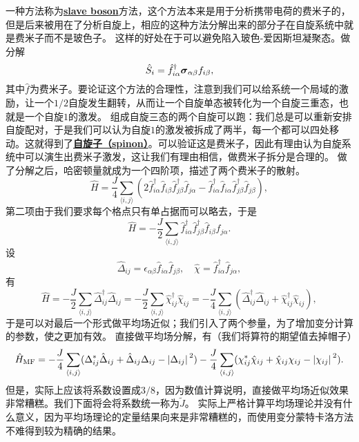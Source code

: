 \documentclass[hyperref, UTF8, a4paper]{ctexart}
\newcommand*{\pair}[1]{\langle #1 \rangle}
\newcommand*{\concept}[1]{\underline{\textbf{#1}}}
\begin{document}
一种方法称为\concept{slave boson}方法，这个方法本来是用于分析携带电荷的费米子的，但是后来被用在了分析自旋上，相应的这种方法分解出来的部分子在自旋系统中就是费米子而不是玻色子。
这样的好处在于可以避免陷入玻色-爱因斯坦凝聚态。做分解
\begin{equation}
    \hat{S}_i = \hat{f}_{i \alpha}^\dagger \vb*{\sigma}_{\alpha \beta} f_{i \beta},
\end{equation}
其中$\hat{f}$为费米子。要论证这个方法的合理性，注意到我们可以给系统一个局域的激励，让一个$1/2$自旋发生翻转，从而让一个自旋单态被转化为一个自旋三重态，也就是一个自旋$1$的激发。
组成自旋三态的两个自旋可以跑：我们总是可以重新安排自旋配对，于是我们可以认为自旋$1$的激发被拆成了两半，每一个都可以四处移动。这就得到了\concept{自旋子（spinon）}。可以验证这是费米子，因此有理由认为自旋系统中可以演生出费米子激发，这让我们有理由相信，做费米子拆分是合理的。
做了分解之后，哈密顿量就成为一个四阶项，描述了两个费米子的散射。
\[
    \hat{H} = \frac{J}{4} \sum_{\pair{i, j}} (2 \hat{f}^\dagger_{i \alpha} \hat{f}_{i \beta} \hat{f}_{j \beta}^\dagger \hat{f}_{j \alpha} - \hat{f}^\dagger_{i \alpha} \hat{f}_{i \alpha} \hat{f}^\dagger_{j \beta} \hat{f}_{j \beta}),
\]
第二项由于我们要求每个格点只有单占据而可以略去，于是
\begin{equation}
    \hat{H} = - \frac{J}{2} \sum_{\pair{i, j}} \hat{f}_{i \alpha}^\dagger \hat{f}_{j \beta}^\dagger \hat{f}_{i \beta} \hat{f}_{j \alpha}.
\end{equation}
设
\begin{equation}
    \hat{\Delta}_{ij} = \epsilon_{\alpha \beta} \hat{f}_{i \alpha} \hat{f}_{j \beta}, \quad \hat{\chi} = \hat{f}^\dagger_{i \alpha} \hat{f}_{j \alpha},
\end{equation}
有
\begin{equation}
    \hat{H} = - \frac{J}{2} \sum_{\pair{i, j}} \hat{\Delta}^\dagger_{ij} \hat{\Delta}_{ij} = - \frac{J}{2} \sum_{\pair{i, j}} \hat{\chi}_{ij}^\dagger \hat{\chi}_{ij} = - \frac{J}{4} \sum_{\pair{i, j}} (\hat{\Delta}^\dagger_{ij} \hat{\Delta}_{ij} + \hat{\chi}^\dagger_{ij} \hat{\chi}_{ij}),
\end{equation}
于是可以对最后一个形式做平均场近似；我们引入了两个参量，为了增加变分计算的参数，使之更加有效。
直接做平均场分解，有（我们将算符的期望值去掉帽子）
\[
    \hat{H}_\text{MF} = - \frac{J}{4} \sum_{\pair{i, j}} (\Delta_{ij}^* \hat{\Delta}_{ij} + \hat{\Delta}_{ij} \Delta_{ij} - \abs*{\Delta_{ij}}^2) - \frac{J}{4} \sum_{\pair{i, j}} (\chi_{ij}^* \hat{\chi}_{ij} + \hat{\chi}_{ij} \chi_{ij} - \abs*{\chi_{ij}}^2).
\]
但是，实际上应该将系数设置成$3/8$，因为数值计算说明，直接做平均场近似效果非常糟糕。我们下面将会将系数统一称为$\tilde{J}$。
实际上严格计算平均场理论并没有什么意义，因为平均场理论的定量结果向来是非常糟糕的，而使用变分蒙特卡洛方法不难得到较为精确的结果。
\end{document}
